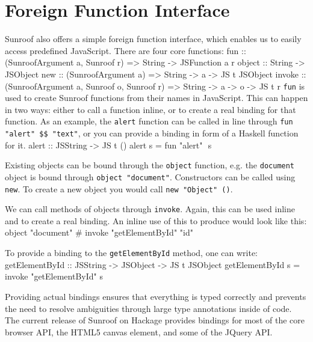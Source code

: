 \documentclass{llncs}
\newcommand{\Src}[1]{{\tt{#1}}}
\newenvironment{Code}{\verbatim}{\endverbatim}
\begin{document}
\section{Foreign Function Interface}
\label{sec:ffi}

Sunroof also offers a simple foreign function interface, 
which enables us to easily 
access predefined JavaScript. There are four core functions:
\begin{Code}
fun    :: (SunroofArgument a, Sunroof r) 
       => String -> JSFunction a r
object :: String -> JSObject
new    :: (SunroofArgument a) 
       => String -> a -> JS t JSObject
invoke :: (SunroofArgument a, Sunroof o, Sunroof r) 
       => String -> a -> o -> JS t r
\end{Code}
\Src{fun} is used to create Sunroof functions from their names in JavaScript.
This can happen in two ways: either to call a function inline, or to 
create a real binding for that function. As an example, 
the \Src{alert} function can be called in line through \Src{fun "alert" \$\$ "text"},
or you can provide a binding in form of a Haskell function for it.
\begin{Code}
alert :: JSString -> JS t ()
alert s = fun "alert" $$ s
\end{Code}

Existing objects can be bound through the \Src{object} function, e.g.
the \Src{document} object is bound through \Src{object "document"}.
Constructors can be called using \Src{new}. To create a new
object you would call \Src{new "Object" ()}.

We can call methods of objects through \Src{invoke}. Again, this 
can be used inline and to create a real binding. An inline 
use of this to produce \linebreak\Src{document.getElementById("id")} would look like this: 
\begin{Code}
  object "document" # invoke "getElementById" "id"
\end{Code}

To provide a binding 
to the \Src{getElementById} method, one can write:
\begin{Code}
getElementById :: JSString -> JSObject -> JS t JSObject
getElementById s = invoke "getElementById" s
\end{Code}

Providing actual bindings ensures that
everything is typed correctly and prevents the need to resolve ambiguities 
through large type annotations inside of code.
%
The current release of Sunroof on Hackage provides bindings for most of the 
core browser API, the HTML5 canvas element, and some of the JQuery API.
\end{document}
